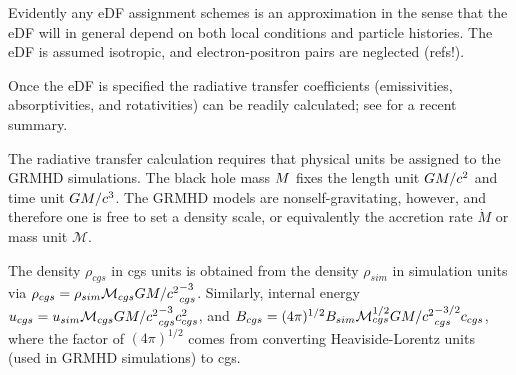 Evidently any eDF assignment schemes is an approximation in the sense that the eDF will in general depend on both local conditions and particle histories.  The eDF is assumed isotropic, and electron-positron pairs are neglected (refs!).

Once the eDF is specified the radiative transfer coefficients (emissivities, absorptivities, and rotativities) can be readily calculated; see \cite{2021ApJ...921...17M} for a recent summary.





\newcommand\Munit{\ensuremath{\mathcal{M}}\xspace}

The radiative transfer calculation requires that physical units be assigned to the GRMHD simulations.  The black hole mass $M$ fixes the length unit $GM/c^2$ and time unit $GM/c^3$.  The GRMHD models are nonself-gravitating, however, and therefore one is free to set a density scale, or equivalently the accretion rate $\dot{M}$ or mass unit $\Munit$.

The density $\rho_{cgs}$ in cgs units is obtained from the density $\rho_{sim}$ in simulation units via $\rho_{cgs} = \rho_{sim} \Munit_{cgs} {\rg}_{cgs}^{-3}$.  Similarly, internal energy $u_{cgs} = u_{sim} \Munit_{cgs} {\rg}_{cgs}^{-3} c_{cgs}^2$, and $B_{cgs} = (4\pi)^{1/2} B_{sim} \Munit_{cgs}^{1/2} {\rg}_{cgs}^{-3/2} c_{cgs}$, where the factor of $(4\pi)^{1/2}$ comes from converting Heaviside-Lorentz units (used in GRMHD simulations) to cgs.


